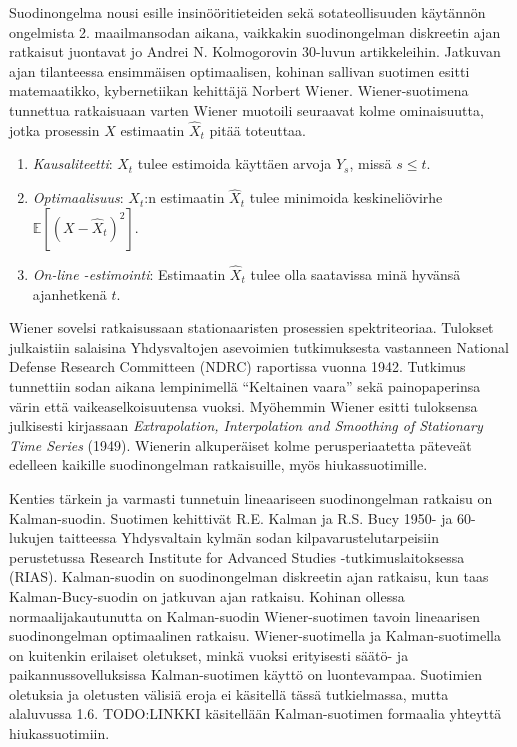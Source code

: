 \documentclass[
  12pt,
  a4paper, twoside]{book}
\begin{document}
Suodinongelma nousi esille insinööritieteiden sekä sotateollisuuden käytännön ongelmista 2. maailmansodan aikana, vaikkakin suodinongelman diskreetin ajan ratkaisut juontavat jo Andrei N. Kolmogorovin 30-luvun artikkeleihin. Jatkuvan ajan tilanteessa ensimmäisen optimaalisen, kohinan sallivan suotimen esitti matemaatikko, kybernetiikan kehittäjä Norbert Wiener. Wiener-suotimena tunnettua ratkaisuaan varten Wiener muotoili seuraavat kolme ominaisuutta, jotka prosessin \(X\) estimaatin \(\hat{X}_t\) pitää toteuttaa.

\begin{enumerate}
\vspace{\baselineskip}
\item \textit{Kausaliteetti}: $X_t$ tulee estimoida käyttäen arvoja $Y_s$, missä $s \leq t$.
\item \textit{Optimaalisuus}: $X_t$:n estimaatin $\hat{X}_t$ tulee minimoida keskineliövirhe $\mathbb{E}[(X-\hat{X}_t)^2]$.
\item \textit{On-line -estimointi}: Estimaatin $\hat{X}_t$ tulee olla saatavissa minä hyvänsä ajanhetkenä $t$. 
\vspace{\baselineskip}
\end{enumerate}

Wiener sovelsi ratkaisussaan stationaaristen prosessien spektriteoriaa. Tulokset julkaistiin salaisina Yhdysvaltojen asevoimien tutkimuksesta vastanneen National Defense Research Committeen (NDRC) raportissa vuonna 1942. Tutkimus tunnettiin sodan aikana lempinimellä ``Keltainen vaara'' sekä painopaperinsa värin että vaikeaselkoisuutensa vuoksi. Myöhemmin Wiener esitti tuloksensa julkisesti kirjassaan \textit{Extrapolation, Interpolation and Smoothing of Stationary Time Series} (1949). Wienerin alkuperäiset kolme perusperiaatetta päteveät edelleen kaikille suodinongelman ratkaisuille, myös hiukassuotimille.

Kenties tärkein ja varmasti tunnetuin lineaariseen suodinongelman ratkaisu on Kalman-suodin. Suotimen kehittivät R.E. Kalman ja R.S. Bucy 1950- ja 60-lukujen taitteessa Yhdysvaltain kylmän sodan kilpavarustelutarpeisiin perustetussa Research Institute for Advanced Studies -tutkimuslaitoksessa (RIAS). Kalman-suodin on suodinongelman diskreetin ajan ratkaisu, kun taas Kalman-Bucy-suodin on jatkuvan ajan ratkaisu. Kohinan ollessa normaalijakautunutta on Kalman-suodin Wiener-suotimen tavoin lineaarisen suodinongelman optimaalinen ratkaisu. Wiener-suotimella ja Kalman-suotimella on kuitenkin erilaiset oletukset, minkä vuoksi erityisesti säätö- ja paikannussovelluksissa Kalman-suotimen käyttö on luontevampaa. Suotimien oletuksia ja oletusten välisiä eroja ei käsitellä tässä tutkielmassa, mutta alaluvussa 1.6. TODO:LINKKI käsitellään Kalman-suotimen formaalia yhteyttä hiukassuotimiin.
\end{document}
